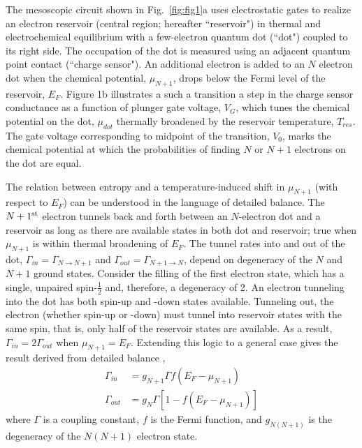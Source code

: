 \documentclass[twocolumn,showpacs,preprintnumbers,amsmath,amssymb,pra,aps,superscriptaddress]{revtex4-1}
\begin{document}
The mesoscopic circuit shown in Fig.~\ref{fig:fig1}a uses electrostatic gates to realize an electron reservoir (central region; hereafter ``reservoir") in thermal and electrochemical equilibrium with a few-electron quantum dot (``dot") coupled to its right side.  The occupation of the dot is measured using an adjacent quantum point contact (``charge sensor")\cite{Staring2007, Frolov2009, Thierschmann2015}.  An additional electron is added to an $N$ electron dot when the chemical potential, $\mu_{N+1}$, drops below the Fermi level of the reservoir, $E_F$. Figure 1b illustrates a such a transition \textemdash a step in the charge sensor conductance as a function of plunger gate voltage, $V_G$, which tunes the chemical potential on the dot, $\mu_{dot}$ \textemdash thermally broadened by the reservoir temperature, $T_{res}$.  The gate voltage corresponding to midpoint of the transition, $V_0$, marks the chemical potential at which the probabilities of finding $N$ or $N+1$ electrons on the dot are equal. 
  
The relation between entropy and a temperature-induced shift in $\mu_{N+1}$ (with respect to $E_F$) can be understood in the language of detailed balance.  The $N+1^{\rm st}$ electron tunnels back and forth between an $N$-electron dot and a reservoir as long as there are available states in both dot and reservoir; true when $\mu_{N+1}$ is within thermal broadening of $E_F$.  The tunnel rates into and out of the dot, $\Gamma_{in}=\Gamma_{N\rightarrow N+1}$ and $\Gamma_{out}=\Gamma_{N+1\rightarrow N}$, depend on degeneracy of the $N$ and $N+1$ ground states.  Consider the filling of the first electron state, which has a single, unpaired spin-$\frac{1}{2}$ and, therefore, a degeneracy of 2. An electron tunneling into the dot has both spin-up and -down states available.  Tunneling out, the electron (whether spin-up or -down) must tunnel into reservoir states with the same spin, that is, only half of the reservoir states are available. As a result, $\Gamma_{in} = 2\Gamma_{out}$ when $\mu_{N+1}=E_F$. Extending this logic to a general case gives the result derived from detailed balance \cite{Gustavsson2009}, 
%
\begin{align}
	\Gamma_{in} &=  g_{N+1} \Gamma f(E_F - \mu_{N+1}) \nonumber \\
	\Gamma_{out} &= g_{N} \Gamma [1 - f(E_F - \mu_{N+1})] \label{eqn:rates}
\end{align}
%
where $\Gamma$ is a coupling constant, $f$ is the Fermi function, and $g_{N(N+1)}$ is the degeneracy of the $N(N+1)$ electron state.
\end{document}
